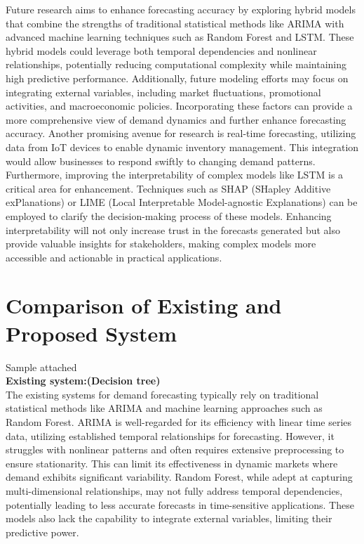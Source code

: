 \documentclass[10pt]{report}
\begin{document}
\begin{center}
Future research aims to enhance forecasting accuracy by exploring hybrid models that combine the strengths of traditional statistical methods like ARIMA with advanced machine learning techniques such as Random Forest and LSTM. These hybrid models could leverage both temporal dependencies and nonlinear relationships, potentially reducing computational complexity while maintaining high predictive performance. Additionally, future modeling efforts may focus on integrating external variables, including market fluctuations, promotional activities, and macroeconomic policies. Incorporating these factors can provide a more comprehensive view of demand dynamics and further enhance forecasting accuracy. Another promising avenue for research is real-time forecasting, utilizing data from IoT devices to enable dynamic inventory management. This integration would allow businesses to respond swiftly to changing demand patterns. Furthermore, improving the interpretability of complex models like LSTM is a critical area for enhancement. Techniques such as SHAP (SHapley Additive exPlanations) or LIME (Local Interpretable Model-agnostic Explanations) can be employed to clarify the decision-making process of these models. Enhancing interpretability will not only increase trust in the forecasts generated but also provide valuable insights for stakeholders, making complex models more accessible and actionable in practical applications.

\section{Comparison of Existing and Proposed System}
{Sample attached}\\

\textbf{Existing system:(Decision tree)}\\ The existing systems for demand forecasting typically rely on traditional statistical methods like ARIMA and machine learning approaches such as Random Forest. ARIMA is well-regarded for its efficiency with linear time series data, utilizing established temporal relationships for forecasting. However, it struggles with nonlinear patterns and often requires extensive preprocessing to ensure stationarity. This can limit its effectiveness in dynamic markets where demand exhibits significant variability. Random Forest, while adept at capturing multi-dimensional relationships, may not fully address temporal dependencies, potentially leading to less accurate forecasts in time-sensitive applications. These models also lack the capability to integrate external variables, limiting their predictive power.


\end{center}
\end{document}
